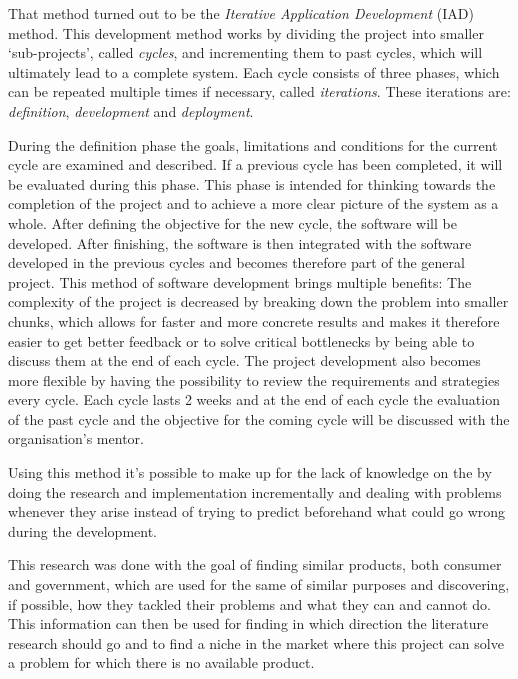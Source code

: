 That method turned out to be the \emph{Iterative Application Development} (IAD) method. This development method works by dividing the project into smaller `sub-projects', called \emph{cycles}, and incrementing them to past cycles, which will ultimately lead to a complete system. Each cycle consists of three phases, which can be repeated multiple times if necessary, called \emph{iterations}. These iterations are: \emph{definition}, \emph{development} and \emph{deployment}.

During the definition phase the goals, limitations and conditions for the current cycle are examined and described. If a previous cycle has been completed, it will be evaluated during this phase. This phase is intended for thinking towards the completion of the project and to achieve a more clear picture of the system as a whole.
After defining the objective for the new cycle, the software will be developed. After finishing, the software is then integrated with the software developed in the previous cycles and becomes therefore part of the general project. This method of software development brings multiple benefits: The complexity of the project is decreased by breaking down the problem into smaller chunks, which allows for faster and more concrete results and makes it therefore easier to get better feedback or to solve critical bottlenecks by being able to discuss them at the end of each cycle. The project development also becomes more flexible by having the possibility to review the requirements and strategies every cycle. Each cycle lasts 2 weeks and at the end of each cycle the evaluation of the past cycle and the objective for the coming cycle will be discussed with the organisation's mentor.

Using this method it's possible to make up for the lack of knowledge on the by doing the research and implementation incrementally and dealing with problems whenever they arise instead of trying to predict beforehand what could go wrong during the development.



This research was done with the goal of finding similar products, both consumer and government, which are used for the same of similar purposes and discovering, if possible, how they tackled their problems and what they can and cannot do. This information can then be used for finding in which direction the literature research should go and to find a niche in the market where this project can solve a problem for which there is no available product. 

